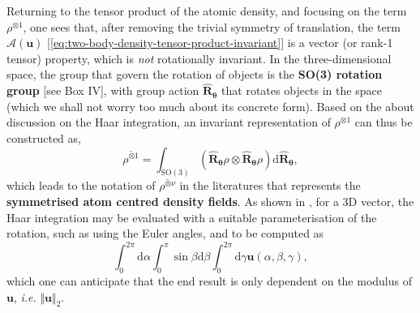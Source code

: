 \begin{myquote}
\hspace{10pt} Returning to the tensor product of the atomic density, and focusing on the term $\rho^{\otimes 1}$, one sees that, after removing the trivial symmetry of translation, the term $\mathcal{A}(\bm{u})$ [\cref{eq:two-body-density-tensor-product-invariant}] is a vector (or rank-1 tensor) property, which is \emph{not} rotationally invariant. In the three-dimensional space, the group that govern the rotation of objects is the \textbf{SO(3) rotation group} [see Box IV], with group action $\hat{\bm{R}}_{\boldsymbol{\theta}}$ that rotates objects in the space (which we shall not worry too much about its concrete form). Based on the about discussion on the Haar integration,  an invariant representation of $\rho^{\otimes 1}$ can thus be constructed as,
\begin{equation}
    \label{eq:two_body_density_rotation_invariance_haar}
    \overline{\rho^{\otimes 1}}=\int_{\mathrm{SO(3)}}\left(\hat{\bm{R}}_{\boldsymbol{\theta}}
    \rho \otimes \hat{\bm{R}}_{\boldsymbol{\theta}}
    \rho\right) \mathrm{d}\hat{\bm{R}}_{\boldsymbol{\theta}},
\end{equation}
which leads to the notation of $\overline{\rho^{\otimes\nu}}$ in the  literatures\cite{willatt2019atom,musil2021physics} that represents the \textbf{symmetrised atom centred density fields}.  As shown in \citet{willatt2019atom}, for a 3D vector, the Haar integration may be evaluated with a suitable parameterisation of the rotation, such as using the Euler angles, and to be computed as
\begin{equation}
    \label{eq:euler_Haar_integration}
    \int_0^{2\pi}\mathrm{d}\alpha\int_0^\pi\sin\beta \mathrm{d}\beta\int_0^{2\pi}\mathrm{d}\gamma \bm{u}(\alpha,\beta,\gamma),
\end{equation}
which one can anticipate that the end result is only dependent on the modulus of $\bm{u}$, \emph{i.e.} $\Vert\bm{u}\Vert_2$.
\end{myquote}

%
%

